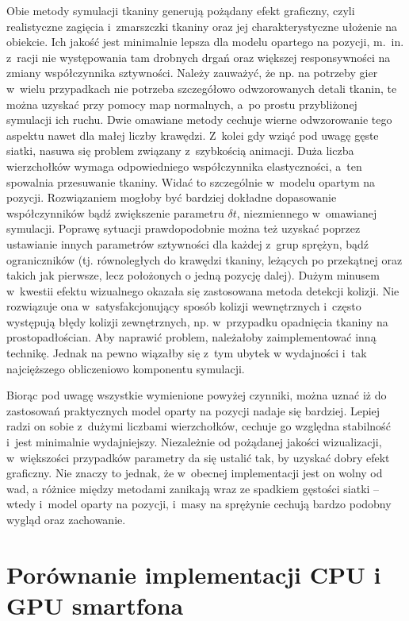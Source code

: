 	Obie metody symulacji tkaniny generują pożądany efekt graficzny, czyli realistyczne zagięcia i~zmarszczki tkaniny oraz jej charakterystyczne ułożenie na obiekcie. Ich jakość jest minimalnie lepsza dla modelu opartego na pozycji, m.~in. z~racji nie występowania tam drobnych drgań oraz większej responsywności na zmiany współczynnika sztywności. Należy zauważyć, że np. na potrzeby gier w~wielu przypadkach nie potrzeba szczegółowo odwzorowanych detali tkanin, te można uzyskać przy pomocy map normalnych, a~po prostu przybliżonej symulacji ich ruchu. Dwie omawiane metody cechuje wierne odwzorowanie tego aspektu nawet dla małej liczby krawędzi. Z~kolei gdy wziąć pod uwagę gęste siatki, nasuwa się problem związany z~szybkością animacji. Duża liczba wierzchołków wymaga odpowiedniego współczynnika elastyczności, a~ten spowalnia przesuwanie tkaniny. Widać to szczególnie w~modelu opartym na pozycji. Rozwiązaniem mogłoby być bardziej dokładne dopasowanie współczynników bądź zwiększenie parametru \( \delta t \), niezmiennego w~omawianej symulacji. Poprawę sytuacji prawdopodobnie można też uzyskać poprzez ustawianie innych parametrów sztywności dla każdej z~grup sprężyn, bądź ograniczników (tj. równoległych do krawędzi tkaniny, leżących po przekątnej oraz takich jak pierwsze, lecz położonych o jedną pozycję dalej). Dużym minusem w~kwestii efektu wizualnego okazała się zastosowana metoda detekcji kolizji. Nie rozwiązuje ona w~satysfakcjonujący sposób kolizji wewnętrznych i~często występują błędy kolizji zewnętrznych, np. w~przypadku opadnięcia tkaniny na prostopadłościan. Aby naprawić problem, należałoby zaimplementować inną technikę. Jednak na pewno wiązałby się z~tym ubytek w wydajności i~tak najcięższego obliczeniowo komponentu symulacji.
	
	Biorąc pod uwagę wszystkie wymienione powyżej czynniki, można uznać iż do zastosowań praktycznych model oparty na pozycji nadaje się bardziej. Lepiej radzi on sobie z~dużymi liczbami wierzchołków, cechuje go względna stabilność i~jest minimalnie wydajniejszy. Niezależnie od pożądanej jakości wizualizacji, w~większości przypadków parametry da się ustalić tak, by uzyskać dobry efekt graficzny. Nie znaczy to jednak, że w~obecnej implementacji jest on wolny od wad, a różnice między metodami zanikają wraz ze spadkiem gęstości siatki -- wtedy i~model oparty na pozycji, i~masy na sprężynie cechują bardzo podobny wygląd oraz zachowanie.
	
	\section{Porównanie implementacji CPU i GPU smartfona}
	\label{t:wnioski:cpu_vs_gpu}
	
